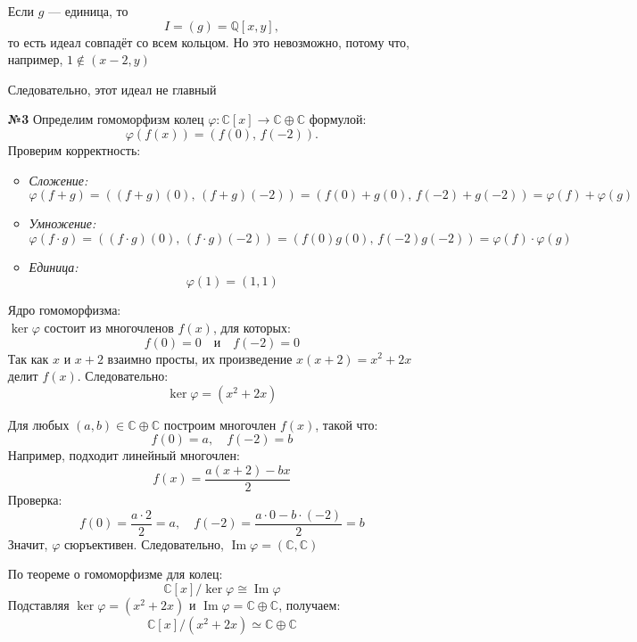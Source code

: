 \documentclass[a4paper]{article}
\renewcommand{\Im}{\operatorname{Im}}
\renewcommand{\phi}{\varphi}
\newcommand{\QQ}{\mathbb{Q}}
\begin{document}
\begin{enumerate}
    Если \(g\) — единица, то  
    \[
        I=(g)=\QQ[x,y],
    \]
    то есть идеал совпадёт со всем кольцом. Но это невозможно, потому что, например,  \(1 \notin (x-2,y)\)

    Следовательно, этот идеал не главный\\

    \item[\textbf{№3}]Определим гомоморфизм колец \(\phi: \mathbb{C}[x] \to \mathbb{C} \oplus \mathbb{C}\) формулой:
    \[
    \phi(f(x)) = \left(f(0),\, f(-2)\right).
    \]
    Проверим корректность:
    \begin{itemize}
        \item \textit{Сложение:} 
        \[
        \phi(f + g) = \left((f + g)(0),\, (f + g)(-2)\right) = \left(f(0) + g(0),\, f(-2) + g(-2)\right) = \phi(f) + \phi(g)
        \]
        \item \textit{Умножение:} 
        \[
        \phi(f \cdot g) = \left((f \cdot g)(0),\, (f \cdot g)(-2)\right) = \left(f(0)g(0),\, f(-2)g(-2)\right) = \phi(f) \cdot \phi(g)
        \]
        \item \textit{Единица:} 
        \[
        \phi(1) = (1, 1)
        \]
    \end{itemize}

    Ядро гомоморфизма: \\
    \(\ker\phi\) состоит из многочленов \(f(x)\), для которых:
    \[
    f(0) = 0 \quad \text{и} \quad f(-2) = 0
    \]
    Так как \(x\) и \(x + 2\) взаимно просты, их произведение \(x(x + 2) = x^2 + 2x\) делит \(f(x)\). Следовательно:
    \[
    \ker\phi = (x^2 + 2x)
    \]

    Для любых \((a, b) \in \mathbb{C} \oplus \mathbb{C}\) построим многочлен \(f(x)\), такой что:
    \[
    f(0) = a, \quad f(-2) = b
    \]
    Например, подходит линейный многочлен:
    \[
    f(x) = \frac{a(x + 2) - b x}{2}
    \]
    Проверка:
    \[
    f(0) = \frac{a \cdot 2}{2} = a, \quad f(-2) = \frac{a \cdot 0 - b \cdot (-2)}{2} = b
    \]
    Значит, \(\phi\) сюръективен. Следовательно, $\Im \phi = (\mathbb{C}, \mathbb{C})$

    По теореме о гомоморфизме для колец:
    \[
    \mathbb{C}[x]/\ker\phi \cong \operatorname{Im}\phi
    \]
    Подставляя \(\ker\phi = (x^2 + 2x)\) и \(\operatorname{Im}\phi = \mathbb{C} \oplus \mathbb{C}\), получаем:
    \[
    \mathbb{C}[x]/(x^2 + 2x) \simeq \mathbb{C} \oplus \mathbb{C}
    \]


\end{enumerate}
\end{document}

